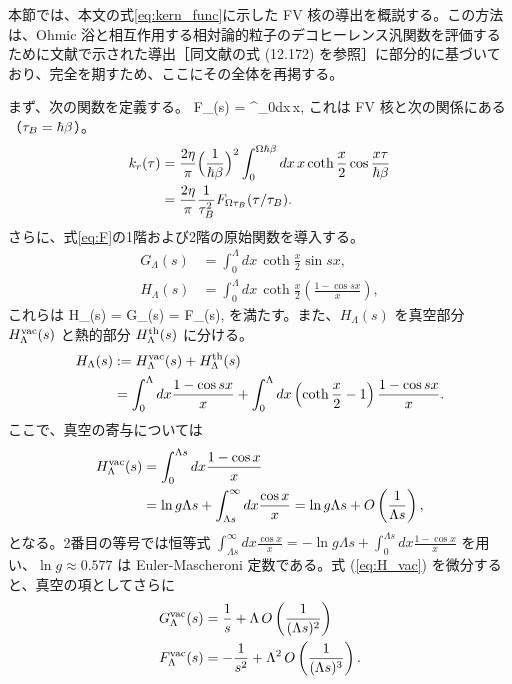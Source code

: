 
本節では、本文の式\eqref{eq:kern_func}に示した FV 核の導出を概説する。この方法は、Ohmic 浴と相互作用する相対論的粒子のデコヒーレンス汎関数を評価するために文献\cite{BP2002}で示された導出［同文献の式 (12.172) を参照］に部分的に基づいており、完全を期すため、ここにその全体を再掲する。

まず、次の関数を定義する。
\be\label{eq:F}
    F_{\Lambda}(s) = \int^{\Lambda}_0dx\,x\coth{},
\ee
これは FV 核と次の関係にある（$\tau_B = \hbar\beta$）。
\begin{align}\label{eq:fv_kern}
	k_r(\tau) &= \frac{2\eta}{\pi}\Big(\frac{1}{\hbar\beta}\Big)^2\int^{\Omega\hbar\beta}_0dx\,x\coth\frac{x}{2}\cos\frac{x\tau}{\hbar\beta} \nonumber\\
		 &= \frac{2\eta}{\pi}\frac{1}{\tau_B^2} F_{\Omega\tau_B}(\tau/\tau_B).
\end{align}
さらに、式\eqref{eq:F}の1階および2階の原始関数を導入する。
\begin{align}
	G_{\Lambda}(s) &= \int^{\Lambda}_0dx\,\coth\frac{x}{2}\sin sx, \\
	H_{\Lambda}(s) &= \int^{\Lambda}_0dx\,\coth\frac{x}{2}\left(\frac{1-\cos sx}{x}\right),
\end{align}
これらは
\be\label{eq:primatives}
	H_{\Lambda}(s) = G_{\Lambda}(s) = F_{\Lambda}(s),
\ee
を満たす。また、$H_{\Lambda}(s)$ を真空部分 $H^{\rm vac}_{\Lambda}(s)$ と熱的部分 $H^{\rm th}_{\Lambda}(s)$ に分ける\cite{BP2002}。
\begin{align}
	H_{\Lambda}(s) &:= H^{\rm vac}_{\Lambda}(s) + H^{\rm th}_{\Lambda}(s) \nonumber\\
    &= \int^{\Lambda}_0dx\frac{1-\cos sx}{x} + \int^{\Lambda}_0dx\left(\coth\frac{x}{2}-1\right)\frac{1-\cos sx}{x}.
\end{align}
ここで、真空の寄与については
\begin{align}\label{eq:H_vac}
	H^{\rm vac}_{\Lambda}(s) &= \int^{\Lambda s}_0dx\frac{1-\cos x}{x} \nonumber\\
					  &= {\rm ln}\,g\Lambda s + \int^{\infty}_{\Lambda s}dx\frac{\cos x}{x} = {\rm ln}\,g\Lambda s + O\left(\frac{1}{\Lambda s}\right),
\end{align}
となる。2番目の等号では恒等式 $\int^{\infty}_{\Lambda s}dx\frac{\cos x}{x} = -\ln g\Lambda s + \int^{\Lambda s}_0dx\frac{1-\cos x}{x}$ を用い、$\ln g\approx 0.577$ は Euler-Mascheroni 定数である。式 (\ref{eq:H_vac}) を微分すると、真空の項としてさらに
\begin{align}
	G^{\rm vac}_{\Lambda}(s) &= \frac{1}{s} + \Lambda \,O\left(\frac{1}{(\Lambda s)^2}\right) \\
	F^{\rm vac}_{\Lambda}(s) &=  -\frac{1}{s^2} + \Lambda^2\,O\left(\frac{1}{(\Lambda s)^3}\right).
\end{align}
